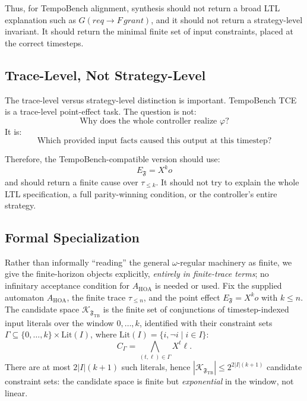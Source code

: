 \documentclass[11pt]{article}
\theoremstyle{remark}
\newcommand{\Frame}{\mathfrak{F}}
\begin{document}
Thus, for TempoBench alignment, synthesis should not return a broad LTL
explanation such as \(G(req\rightarrow F\,grant)\), and it should not return a
strategy-level invariant. It should return the minimal finite set of input
constraints, placed at the correct timesteps.

\subsection{Trace-Level, Not Strategy-Level}

The trace-level versus strategy-level distinction is important. TempoBench TCE
is a trace-level point-effect task. The question is not:
\[
  \text{Why does the whole controller realize } \varphi?
\]
It is:
\[
  \text{Which provided input facts caused this output at this timestep?}
\]

Therefore, the TempoBench-compatible version should use:
\[
  E_{\Frame}=X^k o
\]
and should return a finite cause over \(\tau_{\le k}\). It should not try to
explain the whole LTL specification, a full parity-winning condition, or the
controller's entire strategy.

\subsection{Formal Specialization}

Rather than informally ``reading'' the general \(\omega\)-regular machinery as
finite, we give the finite-horizon objects explicitly, \emph{entirely in
finite-trace terms}; no infinitary acceptance condition for \(A_{\mathrm{HOA}}\)
is needed or used. Fix the supplied automaton \(A_{\mathrm{HOA}}\), the finite
trace \(\tau_{\le n}\), and the point effect \(E_{\Frame}=X^k o\) with \(k\le n\).
The candidate space \(\mathcal{K}_{\Frame_{\mathrm{TB}}}\) is the finite set of
conjunctions of timestep-indexed input literals over the window \(0,\ldots,k\),
identified with their constraint sets
\(\Gamma\subseteq\{0,\ldots,k\}\times \mathrm{Lit}(I)\), where
\(\mathrm{Lit}(I)=\{i,\neg i\mid i\in I\}\):
\[
  C_\Gamma=\bigwedge_{(t,\ell)\in\Gamma}X^t\ell .
\]
There are at most \(2|I|(k+1)\) such literals, hence
\(|\mathcal{K}_{\Frame_{\mathrm{TB}}}|\le 2^{2|I|(k+1)}\) candidate constraint
sets: the candidate space is finite but \emph{exponential} in the window, not
linear.
\end{document}
